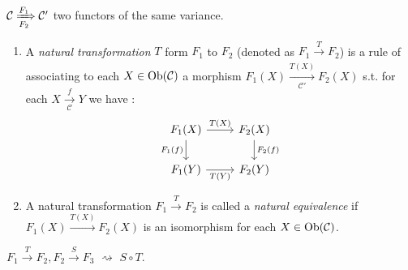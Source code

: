 \begin{definition}
      $\mathcal{C}\xRightarrow[F_2]{F_1}\mathcal{C}'$ two functors of the same variance.
      \begin{enumerate}
	\item 
    A \textit{natural transformation} $T$ form $F_1$ to $F_2$ (denoted as $F_1\xrightarrow[]{T}F_2$) is a rule of associating to each $X\in \operatorname{Ob}(\mathcal{C})$ a morphism $F_1(X)\xrightarrow[\mathcal{C}']{T(X)} F_2(X)$ s.t. for each $X\xrightarrow[\mathcal{C}]{f}Y$ we have :
      \[
      \begin{tikzcd}
	F_1(X)\arrow[swap]{d}{F_1(f)} \arrow{r}{T(X)} &F_2(X) \arrow{d}{F_2(f)} \\
	F_1(Y)\arrow[swap]{r}{T(Y)} &F_2(Y)
      \end{tikzcd}
      \] 
\item A natural transformation $F_1\xrightarrow{T}F_2$ is called a \textit{natural equivalence} if $F_1(X)\xrightarrow{T(X)}F_2(X)$ is an isomorphism for each $X\in \operatorname{Ob}(\mathcal{C})$.
  \end{enumerate}
\end{definition}
$F_1\xrightarrow{T}F_2,F_2\xrightarrow{S} F_3$ $\rightsquigarrow $ $S\circ T$.


